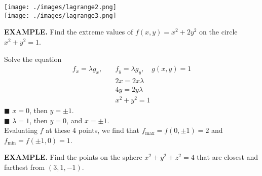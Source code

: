 \documentclass{article}
\begin{document}
\begin{minipage}[]{0.3\linewidth}
  \texttt{[image: ./images/lagrange2.png]}\\
  \texttt{[image: ./images/lagrange3.png]}
  
  
\end{minipage}
\begin{minipage}[]{0.67\linewidth}
  {\selectfont \textbf{\textcolor{blue5}{ EXAMPLE.}}} Find the extreme values of $f(x,y) = x^2 + 2 y^2 $ on the circle $x^2 + y^2 = 1 $.  

  Solve the equation 
  \begin{align*}
  f_x = \lambda g_x, \quad & f_y = \lambda g_y, \quad g(x,y) = 1\\
   &  2x = 2x \lambda \\
   &  4y = 2y \lambda \\
   &  x^2 + y^2 = 1 
  \end{align*}
\textcolor{blue5}{\small $\blacksquare$} $x = 0$, then $y = \pm 1$.\\
\textcolor{blue5}{\small $\blacksquare$} $\lambda = 1$, then $y = 0$, and $x = \pm 1$.\\
Evaluating $f$ at these 4 points, we find that $f_ \text{max} = f(0, \pm 1) = 2$ and $f_ \text{min} = f(\pm 1, 0) = 1 $.
\end{minipage}

{\selectfont \textbf{\textcolor{blue5}{ EXAMPLE.}}} Find the points on the sphere $x^2 + y^2 + z^2 = 4 $ that are closest and farthest from $(3,1,-1)$.
\end{document}
